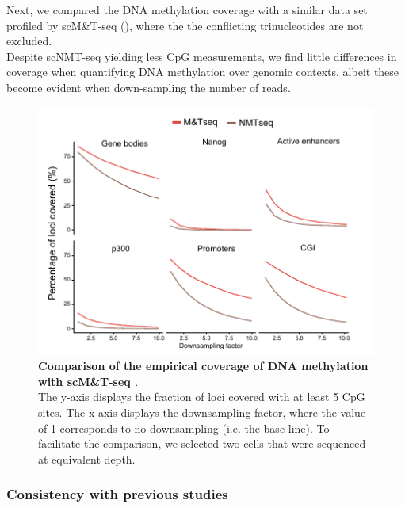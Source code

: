Next, we compared the DNA methylation coverage with a similar data set profiled by scM\&T-seq \cite{Angermueller2016} (), where the the conflicting trinucleotides are not excluded.\\
Despite scNMT-seq yielding less CpG measurements, we find little differences in coverage when quantifying DNA methylation over genomic contexts, albeit these become evident when down-sampling the number of reads.

\begin{figure}[H]
	\centering
	\includegraphics[width=0.8\linewidth]{scNMT_coverage2}
	\caption[]{\textbf{Comparison of the empirical coverage of DNA methylation with scM\&T-seq \cite{Angermueller2016}}.\\
	The y-axis displays the fraction of loci covered with at least 5 CpG sites. The x-axis displays the downsampling factor, where the value of 1 corresponds to no downsampling (i.e. the base line). To facilitate the comparison, we selected two cells that were sequenced at equivalent depth.}
	\label{fig:scnmt_coverage2}
\end{figure}

\subsubsection{Consistency with previous studies}


